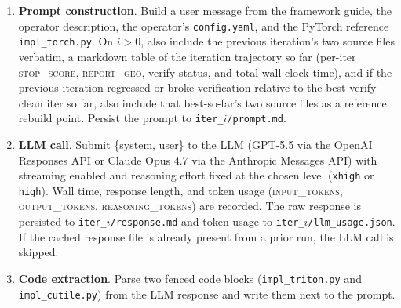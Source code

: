 \documentclass[11pt]{article}
\begin{document}
\begin{enumerate}[leftmargin=*, label=\arabic*.]
    \item \textbf{Prompt construction}. Build a user message from the
    framework guide, the operator description, the operator's
    \texttt{config.yaml}, and the PyTorch reference
    \texttt{impl\_torch.py}. On $i > 0$, also include the previous
    iteration's two source files verbatim, a markdown table of the
    iteration trajectory so far (per-iter \textsc{stop\_score},
    \textsc{report\_geo}, verify status, and total wall-clock time), and
    if the previous iteration regressed or broke verification relative
    to the best verify-clean iter so far, also include that
    best-so-far's two source files as a reference rebuild point. Persist
    the prompt to \texttt{iter\_$i$/prompt.md}.

    \item \textbf{LLM call}. Submit \{system, user\} to the LLM
    (GPT-5.5 via the OpenAI Responses API or Claude Opus 4.7 via the
    Anthropic Messages API) with streaming enabled and reasoning effort
    fixed at the chosen level (\texttt{xhigh} or \texttt{high}). Wall
    time, response length, and token usage
    (\textsc{input\_tokens}, \textsc{output\_tokens},
    \textsc{reasoning\_tokens}) are recorded. The raw response is
    persisted to \texttt{iter\_$i$/response.md} and token usage to
    \texttt{iter\_$i$/llm\_usage.json}. If the cached response file is
    already present from a prior run, the LLM call is skipped.

    \item \textbf{Code extraction}. Parse two fenced code blocks
    (\texttt{impl\_triton.py} and \texttt{impl\_cutile.py}) from the LLM
    response and write them next to the prompt.


\end{enumerate}
\end{document}
